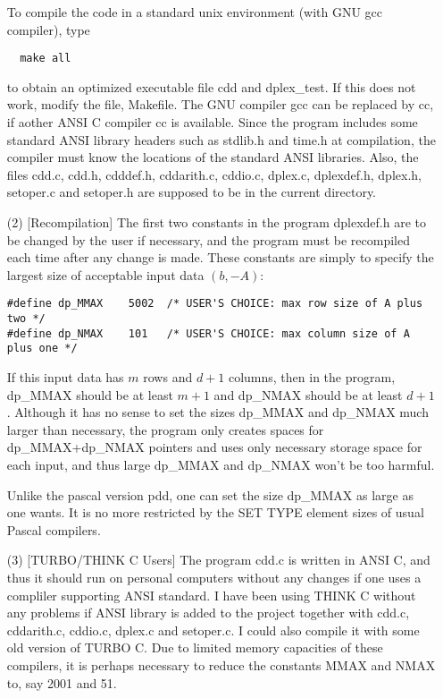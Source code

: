 \begin{itemize}
\noindent
To compile the code in a standard unix environment (with GNU gcc compiler), type
\begin{verbatim}
  make all
\end{verbatim}
to obtain an optimized executable file cdd and dplex\_test.  If this does not work,
modify the file, Makefile. The GNU compiler gcc can be replaced by cc, 
if aother ANSI  C compiler cc is available.
Since the program includes some standard ANSI library 
headers such as stdlib.h and time.h at compilation, 
the compiler must know the locations of the standard ANSI libraries.
Also, the files cdd.c, cdd.h, cdddef.h, cddarith.c, cddio.c, dplex.c, dplexdef.h,
dplex.h, setoper.c and  setoper.h are supposed to be
in the current directory.

\item[(2)] [Recompilation] The first two constants in the program dplexdef.h are to be 
changed by the user if necessary, and the program must be recompiled
each time after any change is made.   These constants are simply
to specify the largest size of acceptable input data $(b, -A)$: 
\begin{verbatim}
#define dp_MMAX    5002  /* USER'S CHOICE: max row size of A plus two */
#define dp_NMAX    101   /* USER'S CHOICE: max column size of A plus one */
\end{verbatim}
If this input data has $m$ rows and $d+1$ columns, then in the program,
dp\_MMAX should be at least $m+1$ and dp\_NMAX should be at least
$d+1$.  Although it has no sense to set the sizes 
dp\_MMAX and dp\_NMAX much larger
than necessary, the program only creates spaces 
for dp\_MMAX+dp\_NMAX pointers
and uses only necessary storage space for each input, and
thus large dp\_MMAX and dp\_NMAX won't be too harmful.

Unlike the pascal version pdd, one can set the size dp\_MMAX as large as one
wants.  It is no more restricted by the SET TYPE element sizes of 
usual Pascal compilers.

\item[(3)] [TURBO/THINK C Users] The program cdd.c is written in
ANSI C, and thus it should run on
personal computers without any changes if one uses a compliler supporting
ANSI standard. I have been using  THINK C without
any problems if ANSI library is added to the project together with
cdd.c, cddarith.c, cddio.c, dplex.c and setoper.c.  
I could also compile it with some
old version of TURBO C.  Due to limited memory capacities of
these compilers, it is perhaps necessary to reduce the constants MMAX and NMAX
to, say 2001 and 51.
\end{itemize}


